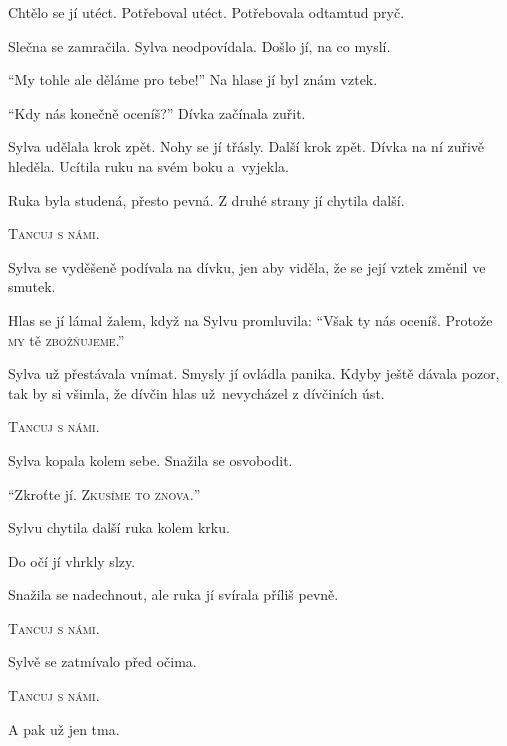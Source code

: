 \documentclass[10pt]{article}
\begin{document}
\begin{spacing}{1}
	Chtělo se jí utéct.
	Potřeboval utéct.
	Potřebovala odtamtud pryč.\par
	Slečna se zamračila.
	Sylva neodpovídala.
	Došlo jí, na co myslí.\par
	\enquote{My tohle ale děláme pro tebe!} Na hlase jí byl znám vztek.\par
	\enquote{Kdy nás konečně oceníš?} Dívka začínala zuřit.\par
	Sylva udělala krok zpět.
	Nohy se jí třásly.
	Další krok zpět.
	Dívka na ní zuřivě hleděla.
	Ucítila ruku na svém boku a~vyjekla.\par
	Ruka byla studená, přesto pevná.
	Z druhé strany jí chytila další.\par
	\textsc{Tancuj s námi.}\par
	Sylva se vyděšeně podívala na dívku, jen aby viděla, že se její vztek změnil ve smutek.\par
	Hlas se jí lámal žalem, když na Sylvu promluvila: \enquote{Však ty nás oceníš.
	Protože \textsc{my} tě \textsc{zbožňujeme}.}\par
	Sylva už přestávala vnímat.
	Smysly jí ovládla panika.
	Kdyby ještě dávala pozor, tak by si všimla, že dívčin hlas už~nevycházel z dívčiních úst.\par
	\textsc{Tancuj s námi.}\par
	Sylva kopala kolem sebe.
	Snažila se osvobodit.\par
	\enquote{Zkroťte jí. \textsc{Zkusíme to znova.}}\par
	Sylvu chytila další ruka kolem krku.\par
	Do očí jí vhrkly slzy.\par
	Snažila se nadechnout, ale ruka jí svírala příliš pevně.\par
	\fontsize{8pt}{9pt}\selectfont \textsc{Tancuj s námi.}\par
	\fontsize{7pt}{8pt}\selectfont Sylvě se zatmívalo před očima.\par
	\fontsize{6pt}{7pt}\selectfont \textsc{Tancuj s námi.}\par
	\fontsize{6pt}{6pt}\selectfont A pak už jen tma.
	
\newpage\fontsize{10pt}{12pt}\selectfont
	

\end{spacing}
\end{document}
